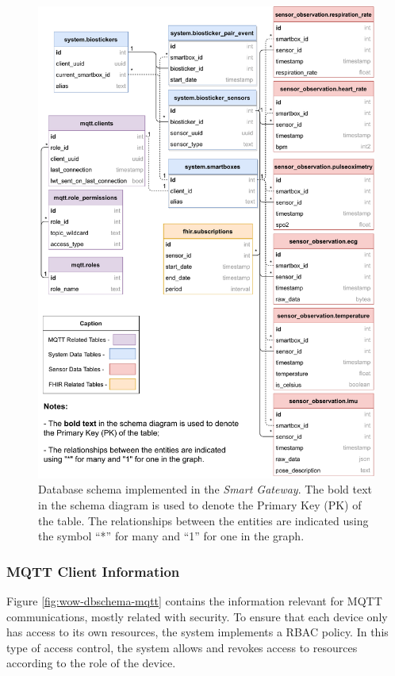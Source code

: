 \begin{figure}[H]
    \centering
    \includegraphics[width=0.9\linewidth]{images/database-schema-general.pdf}
    \caption[Database schema implemented in the \textit{Smart Gateway}.]{Database schema implemented in the \textit{Smart Gateway}. The bold text in the schema diagram is used to denote the Primary Key (PK) of the table. The relationships between the entities are indicated using the symbol ``*'' for many and ``1'' for one in the graph.}
    \label{fig:wow-dbschema-full}
\end{figure}

\subsubsection{MQTT Client Information}

Figure \ref{fig:wow-dbschema-mqtt} contains the information relevant for \acs{MQTT} communications, mostly related with security. To ensure that each device only has access to its own resources, the system implements a \acf{RBAC} policy. 
In this type of access control, the system allows and revokes access to resources according to the role of the device. 

